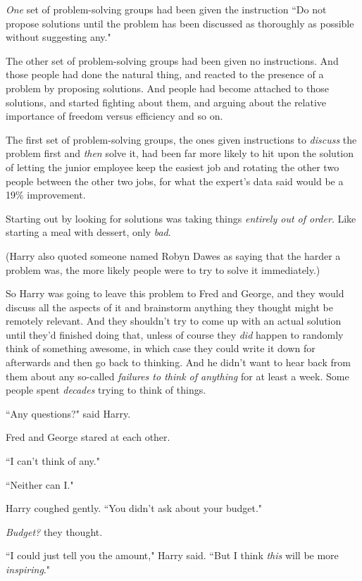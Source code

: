 \emph{One} set of problem-solving groups had been given the instruction ``Do not propose solutions until the problem has been discussed as thoroughly as possible without suggesting any."

The other set of problem-solving groups had been given no instructions. And those people had done the natural thing, and reacted to the presence of a problem by proposing solutions. And people had become attached to those solutions, and started fighting about them, and arguing about the relative importance of freedom versus efficiency and so on.

The first set of problem-solving groups, the ones given instructions to \emph{discuss} the problem first and \emph{then} solve it, had been far more likely to hit upon the solution of letting the junior employee keep the easiest job and rotating the other two people between the other two jobs, for what the expert's data said would be a 19\% improvement.

Starting out by looking for solutions was taking things \emph{entirely out of order}. Like starting a meal with dessert, only \emph{bad}.

(Harry also quoted someone named Robyn Dawes as saying that the harder a problem was, the more likely people were to try to solve it immediately.)

So Harry was going to leave this problem to Fred and George, and they would discuss all the aspects of it and brainstorm anything they thought might be remotely relevant. And they shouldn't try to come up with an actual solution until they'd finished doing that, unless of course they \emph{did} happen to randomly think of something awesome, in which case they could write it down for afterwards and then go back to thinking. And he didn't want to hear back from them about any so-called \emph{failures to think of anything} for at least a week. Some people spent \emph{decades} trying to think of things.

``Any questions?" said Harry.

Fred and George stared at each other.

``I can't think of any."

``Neither can I."

Harry coughed gently. ``You didn't ask about your budget."

\emph{Budget?} they thought.

``I could just tell you the amount," Harry said. ``But I think \emph{this} will be more \emph{inspiring}."


